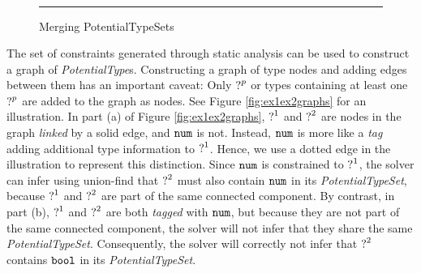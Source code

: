 \begin{figure}[h!]
\[\begin{array}{rcl}
\end{array}\] 
\caption{Merging PotentialTypeSets}
\vspace{5px} 
\hrule
\label{fig:possible_type_sets}
\vspace{-5px}
\end{figure}

The set of constraints generated through static analysis can be used to construct a graph of \textit{PotentialType}s. Constructing a graph of type nodes and adding edges between them has an important caveat: Only $\mathtt{?}^{p}$ or types containing at least one $\mathtt{?}^{p}$ are added to the graph as nodes. See Figure \ref{fig:ex1ex2graphs} for an illustration. In part (a) of Figure \ref{fig:ex1ex2graphs}, $\mathtt{?}^{1}$ and $\mathtt{?}^{2}$ are nodes in the graph \textit{linked} by a solid edge, and $\mathtt{num}$ is not. Instead, $\mathtt{num}$ is more like a \textit{tag} adding additional type information to $\mathtt{?}^{1}$. Hence, we use a dotted edge in the illustration to represent this distinction. Since $\mathtt{num}$ is constrained to $\mathtt{?}^{1}$, the solver can infer using union-find that $\mathtt{?}^{2}$ must also contain $\mathtt{num}$ in its \textit{PotentialTypeSet}, because $\mathtt{?}^{1}$ and $\mathtt{?}^{2}$ are part of the same connected component. By contrast, in part (b), $\mathtt{?}^{1}$ and $\mathtt{?}^{2}$ are both \textit{tagged} with $\mathtt{num}$, but because they are not part of the same connected component, the solver will not infer that they share the same \textit{PotentialTypeSet}. Consequently, the solver will correctly not infer that $\mathtt{?}^2$ contains $\mathtt{bool}$ in its \textit{PotentialTypeSet}.

